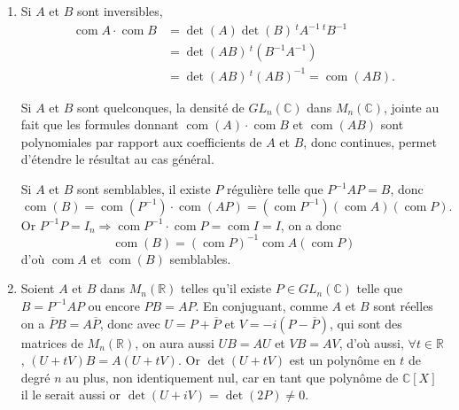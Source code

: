 \begin{enumerate}[label=\arabic*.,leftmargin=2.2em,itemsep=1.2em]
\emph{2e cas : $A$ symétrique.} On prend les traces $\Rightarrow(2-\operatorname{tr}A)(\operatorname{tr}X)=0$.

Si $\operatorname{tr}A\ne2$, on doit avoir $\operatorname{tr}X=0$, l'équation devient $X+{}^tX=0$ soit $X$ antisymétrique. C'est effectivement solution.

Si $\operatorname{tr}A=2$, les matrices antisymétriques sont encore solutions. Or l'équation est linéaire en $X$, et une matrice s'écrit de manière unique sous la forme $X=Y+Z$ avec $Y$ symétrique et $Z$ antisymétrique.

Donc $X$ solution $\Longleftrightarrow$ sa partie symétrique l'est $\Longleftrightarrow2Y=(\operatorname{tr}Y)A$. On a $Y$ du type $\lambda A$, d'où $2\lambda A=(\lambda\operatorname{tr}A)A$ et comme $\operatorname{tr}A=2$, tout $\lambda$ convient.

Finalement, si $A$ symétrique et $\operatorname{tr}A=2$ les solutions sont du type $X=\lambda A+Z$ avec $Z$ antisymétrique quelconque. Sinon il n'y a que les $Z$ antisymétriques comme solutions.

\item Si $A$ et $B$ sont inversibles,
\[
\begin{aligned}
\operatorname{com}A\cdot\operatorname{com}B
&=\det(A)\det(B)\,{}^tA^{-1}\,{}^tB^{-1}\\
&=\det(AB)\,{}^t(B^{-1}A^{-1})\\
&=\det(AB)\,{}^t(AB)^{-1}=\operatorname{com}(AB).
\end{aligned}
\]

Si $A$ et $B$ sont quelconques, la densité de $GL_n(\mathbb C)$ dans $M_n(\mathbb C)$, jointe au fait que les formules donnant $\operatorname{com}(A)\cdot\operatorname{com}B$ et $\operatorname{com}(AB)$ sont polynomiales par rapport aux coefficients de $A$ et $B$, donc continues, permet d'étendre le résultat au cas général.

Si $A$ et $B$ sont semblables, il existe $P$ régulière telle que $P^{-1}AP=B$, donc
\[
\operatorname{com}(B)=\operatorname{com}(P^{-1})\cdot\operatorname{com}(AP)
=(\operatorname{com}P^{-1})(\operatorname{com}A)(\operatorname{com}P).
\]
Or $P^{-1}P=I_n\Rightarrow\operatorname{com}P^{-1}\cdot\operatorname{com}P=\operatorname{com}I=I$, on a donc
\[
\operatorname{com}(B)=(\operatorname{com}P)^{-1}\operatorname{com}A(\operatorname{com}P)
\]
d'où $\operatorname{com}A$ et $\operatorname{com}(B)$ semblables.

\item Soient $A$ et $B$ dans $M_n(\mathbb R)$ telles qu'il existe $P\in GL_n(\mathbb C)$ telle que $B=P^{-1}AP$ ou encore $PB=AP$. En conjuguant, comme $A$ et $B$ sont réelles on a $\overline P B=A\overline P$, donc avec $U=P+\overline P$ et $V=-i(P-\overline P)$, qui sont des matrices de $M_n(\mathbb R)$, on aura aussi $UB=AU$ et $VB=AV$, d'où aussi, $\forall t\in\mathbb R$, $(U+tV)B=A(U+tV)$. Or $\det(U+tV)$ est un polynôme en $t$ de degré $n$ au plus, non identiquement nul, car en tant que polynôme de $\mathbb C[X]$ il le serait aussi or $\det(U+iV)=\det(2P)\ne0$.


\end{enumerate}
